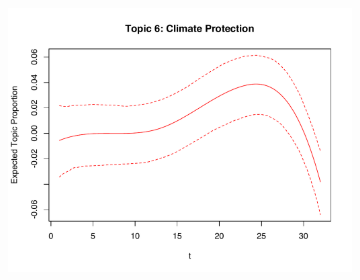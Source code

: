 \documentclass[xcolor=dvipsnames]{beamer}
\begin{document}
\begin{frame}
\begin{figure}[h!]
\begin{subfigure}[b]{0.4\linewidth}
    \includegraphics[width=\linewidth]{../plots/presentation/estEffect_topic6.pdf}
  \end{subfigure}
\end{figure}
\end{frame}
\end{document}
